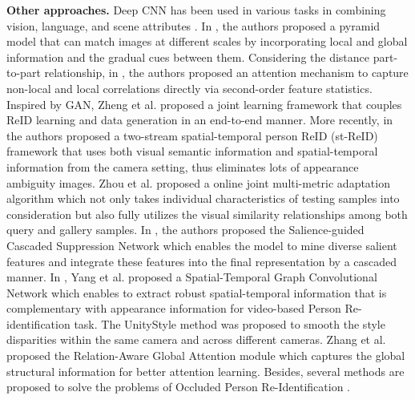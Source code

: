 \documentclass[final]{cvpr}
\begin{document}
\textbf{Other approaches.} Deep CNN has been used in various tasks in combining vision, language, and scene attributes \cite{sona, nguyennav,nguyen2019v2cnet, chen2020salience, do2018affordancenet,  nguyen2019object}. In \cite{pyramid}, the authors proposed a pyramid model that can match images at different scales by incorporating local and global information and the gradual cues between them. Considering the distance part-to-part relationship, in \cite{sona}, the authors proposed an attention mechanism to capture non-local and local correlations directly via second-order feature statistics. Inspired by GAN, Zheng et al. \cite{dg-net} proposed a joint learning framework that couples ReID learning and data generation in an end-to-end manner. More recently, in \cite{st-ReID} the authors proposed a two-stream spatial-temporal person ReID (st-ReID) framework that uses both visual semantic information and spatial-temporal information from the camera setting, thus eliminates lots of appearance ambiguity images.
Zhou et al.\cite{zhou2020online} proposed a online joint multi-metric adaptation algorithm which not only takes individual characteristics of testing samples into consideration but also fully utilizes the visual similarity relationships among both query and gallery samples. In \cite{chen2020salience}, the authors proposed the Salience-guided Cascaded Suppression Network which enables the model to mine diverse salient features and integrate these features into the final representation by a cascaded manner. In \cite{yang2020spatial}, Yang et al. proposed a Spatial-Temporal Graph Convolutional Network which enables to extract robust spatial-temporal information that is complementary with appearance information for video-based Person Re-identification task. The UnityStyle \cite{liu2020unity} method was proposed to smooth the style disparities within the same camera and across different cameras. Zhang et al. \cite{zhang2020relation} proposed the Relation-Aware Global Attention module which captures the global structural information for better attention learning. Besides, several methods are proposed to solve the problems of Occluded Person Re-Identification \cite{fpr,miao2019pose,gao2020pose,wang2020high}.
\end{document}
